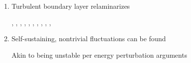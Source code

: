 \documentclass[mathserif]{beamer}
\begin{document}
\begin{frame}{}
\begin{columns}
\begin{column}{0.75\textwidth}
\begin{description}[<+->][Q]
\begin{enumerate}[<+->]
            \item Turbulent boundary layer relaminarizes\\
                  \medskip
                  \begin{scriptsize}
                        \citet{Schraub1965Study},
                        \citet{Blackwelder1972Largescale},
                        \citet{Narasimha1973Relaminarization},
                        \citet{Narasimha1979Relaminarization},
                        \citet{Sreenivasan1982Laminarescent},
                        \citet{Iida1998Relaminarization},
                        \citet{Ichimiya1998Properties},
                        \citet{Talamelli2002Experimental},
                        \citet{Mukund2006Relaminarization},
                        \citet{Cal2008Similarity},
                        \citet{Bourassa2009Experimental}
                  \end{scriptsize}
                  \medskip
            \item Self-sustaining, nontrivial fluctuations can be found\\
                  \medskip
                  \begin{scriptsize}
                      Akin to being unstable per energy perturbation arguments
                  \end{scriptsize}
                  \medskip
        \end{enumerate}
  \end{description}
  \end{column}
\end{columns}
\end{frame}
\end{document}
